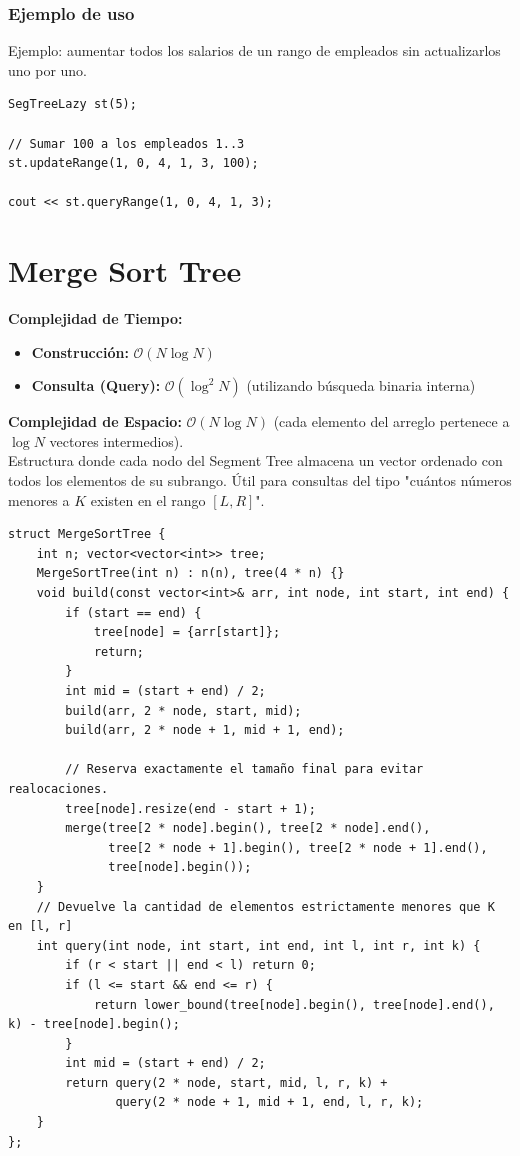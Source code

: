 \documentclass[10pt,twocolumn,letterpaper]{report}
\begin{document}
\subsubsection*{Ejemplo de uso}
Ejemplo: aumentar todos los salarios de un rango de empleados sin actualizarlos uno por uno.
\begin{lstlisting}
SegTreeLazy st(5);

// Sumar 100 a los empleados 1..3
st.updateRange(1, 0, 4, 1, 3, 100);

cout << st.queryRange(1, 0, 4, 1, 3);
\end{lstlisting}

\section{Merge Sort Tree}
\textbf{Complejidad de Tiempo:}
\begin{itemize}
    \item \textbf{Construcción:} $\mathcal{O}(N \log N)$
    \item \textbf{Consulta (Query):} $\mathcal{O}(\log^2 N)$ (utilizando búsqueda binaria interna)
\end{itemize}
\textbf{Complejidad de Espacio:} $\mathcal{O}(N \log N)$ (cada elemento del arreglo pertenece a $\log N$ vectores intermedios). \\
Estructura donde cada nodo del Segment Tree almacena un vector ordenado con todos los elementos de su subrango. Útil para consultas del tipo "cuántos números menores a $K$ existen en el rango $[L, R]$".
\begin{lstlisting}
struct MergeSortTree {
    int n; vector<vector<int>> tree;
    MergeSortTree(int n) : n(n), tree(4 * n) {}
    void build(const vector<int>& arr, int node, int start, int end) {
        if (start == end) {
            tree[node] = {arr[start]};
            return;
        }
        int mid = (start + end) / 2;
        build(arr, 2 * node, start, mid);
        build(arr, 2 * node + 1, mid + 1, end);
        
        // Reserva exactamente el tamaño final para evitar realocaciones.
        tree[node].resize(end - start + 1);
        merge(tree[2 * node].begin(), tree[2 * node].end(),
              tree[2 * node + 1].begin(), tree[2 * node + 1].end(),
              tree[node].begin());
    }
    // Devuelve la cantidad de elementos estrictamente menores que K en [l, r]
    int query(int node, int start, int end, int l, int r, int k) {
        if (r < start || end < l) return 0;
        if (l <= start && end <= r) {
            return lower_bound(tree[node].begin(), tree[node].end(), k) - tree[node].begin();
        }
        int mid = (start + end) / 2;
        return query(2 * node, start, mid, l, r, k) + 
               query(2 * node + 1, mid + 1, end, l, r, k);
    }
};
\end{lstlisting}
\end{document}
